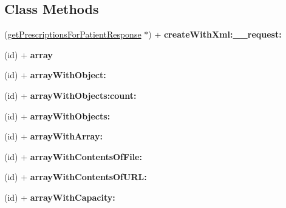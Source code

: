 \subsection*{Class Methods}
\begin{DoxyCompactItemize}
\item 
\hypertarget{interfaceget_prescriptions_for_patient_response_a132578d02efbe8244d98a4763d233522}{}(\hyperlink{interfaceget_prescriptions_for_patient_response}{get\+Prescriptions\+For\+Patient\+Response} $\ast$) + {\bfseries create\+With\+Xml\+:\+\_\+\+\_\+request\+:}\label{interfaceget_prescriptions_for_patient_response_a132578d02efbe8244d98a4763d233522}

\item 
\hypertarget{interfaceget_prescriptions_for_patient_response_a0d41f361bd48e3bd9120926d475f8d2e}{}(id) + {\bfseries array}\label{interfaceget_prescriptions_for_patient_response_a0d41f361bd48e3bd9120926d475f8d2e}

\item 
\hypertarget{interfaceget_prescriptions_for_patient_response_ac4ed80bc92f97df5a4b516360a88d6e2}{}(id) + {\bfseries array\+With\+Object\+:}\label{interfaceget_prescriptions_for_patient_response_ac4ed80bc92f97df5a4b516360a88d6e2}

\item 
\hypertarget{interfaceget_prescriptions_for_patient_response_aacfb1766e1d7f7bd904475b2855eedc5}{}(id) + {\bfseries array\+With\+Objects\+:count\+:}\label{interfaceget_prescriptions_for_patient_response_aacfb1766e1d7f7bd904475b2855eedc5}

\item 
\hypertarget{interfaceget_prescriptions_for_patient_response_aca4c263922c8a4aeabb5ef2d1a9f57ed}{}(id) + {\bfseries array\+With\+Objects\+:}\label{interfaceget_prescriptions_for_patient_response_aca4c263922c8a4aeabb5ef2d1a9f57ed}

\item 
\hypertarget{interfaceget_prescriptions_for_patient_response_a66d1b1f866ae4be1ae0cb18dc552f317}{}(id) + {\bfseries array\+With\+Array\+:}\label{interfaceget_prescriptions_for_patient_response_a66d1b1f866ae4be1ae0cb18dc552f317}

\item 
\hypertarget{interfaceget_prescriptions_for_patient_response_a58a3f002c463e02dc6b5223d55b5714e}{}(id) + {\bfseries array\+With\+Contents\+Of\+File\+:}\label{interfaceget_prescriptions_for_patient_response_a58a3f002c463e02dc6b5223d55b5714e}

\item 
\hypertarget{interfaceget_prescriptions_for_patient_response_abe258a85b895be76305ca6487097a1a0}{}(id) + {\bfseries array\+With\+Contents\+Of\+U\+R\+L\+:}\label{interfaceget_prescriptions_for_patient_response_abe258a85b895be76305ca6487097a1a0}

\item 
\hypertarget{interfaceget_prescriptions_for_patient_response_abd74893ad6c44fdbaca31e9eb84e5f8b}{}(id) + {\bfseries array\+With\+Capacity\+:}\label{interfaceget_prescriptions_for_patient_response_abd74893ad6c44fdbaca31e9eb84e5f8b}

\end{DoxyCompactItemize}
